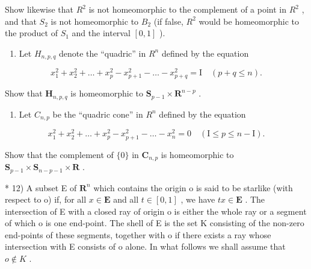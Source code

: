 Show likewise that \(R^{2}\) is not homeomorphic to the complement of a point in \(R^{2}\) , and that \(S_{2}\) is not homeomorphic to \(B_{2}\) (if false, \(R^{2}\) would be homeomorphic to the product of \(S_{1}\) and the interval \([0, 1]\) ).

\begin{enumerate}
\def\labelenumi{\arabic{enumi})}
\setcounter{enumi}{9}
\tightlist
\item
  Let \(H_{n,p,q}\) denote the ``quadric'' in \(R^{n}\) defined by the equation
\end{enumerate}

\[
x _ {1} ^ {2} + x _ {2} ^ {2} + \dots + x _ {p} ^ {2} - x _ {p + 1} ^ {2} - \dots - x _ {p + q} ^ {2} = \mathrm{I} \quad (p + q \leqslant n).
\]

Show that \(\mathbf{H}_{n,p,q}\) is homeomorphic to \(\mathbf{S}_{p - 1}\times \mathbf{R}^{n - p}\) .

\begin{enumerate}
\def\labelenumi{\arabic{enumi})}
\setcounter{enumi}{10}
\tightlist
\item
  Let \(C_{n,p}\) be the ``quadric cone'' in \(R^{n}\) defined by the equation
\end{enumerate}

\[
x _ {1} ^ {2} + x _ {2} ^ {2} + \dots + x _ {p} ^ {2} - x _ {p + 1} ^ {2} - \dots - x _ {n} ^ {2} = 0 \quad (\mathrm{I} \leqslant p \leqslant n - \mathrm{I}).
\]

Show that the complement of \(\{0\}\) in \(\mathbf{C}_{n,p}\) is homeomorphic to \(\mathbf{S}_{p-1} \times \mathbf{S}_{n-p-1} \times \mathbf{R}\) .

* 12) A subset E of \(\mathbf{R}^n\) which contains the origin o is said to be starlike (with respect to o) if, for all \(x \in \mathbf{E}\) and all \(t \in [0, 1]\) , we have \(tx \in \mathbf{E}\) . The intersection of E with a closed ray of origin o is either the whole ray or a segment of which o is one end-point. The shell of E is the set K consisting of the non-zero end-points of these segments, together with o if there exists a ray whose intersection with E consists of o alone. In what follows we shall assume that \(o \notin K\) .

